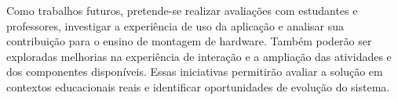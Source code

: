\documentclass[11pt,a4paper]{article}
\begin{document}
Como trabalhos futuros, pretende-se realizar avaliações com estudantes e professores, investigar a experiência de uso da aplicação e analisar sua contribuição para o ensino de montagem de hardware. Também poderão ser exploradas melhorias na experiência de interação e a ampliação das atividades e dos componentes disponíveis. Essas iniciativas permitirão avaliar a solução em contextos educacionais reais e identificar oportunidades de evolução do sistema.



\end{document}

